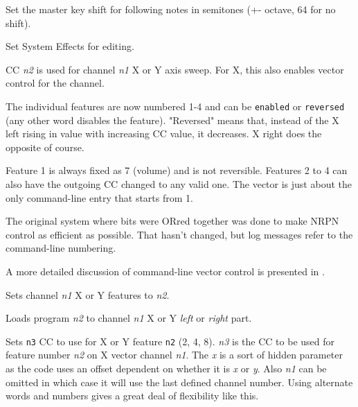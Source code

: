       Set the master key shift for following notes in semitones (+-
      octave, 64 for no shift).

      Set System Effects for editing.

      CC \textsl{n2} is used for channel \textsl{n1} X or Y axis sweep.
      For X, this also enables vector control for the channel.

      The individual features are now numbered 1-4 and can be
       \texttt{enabled} or
       \texttt{reversed} (any
      other word disables the feature).
      "Reversed" means that, instead of the X left rising in
      value with increasing CC value, it decreases.
      X right does the opposite of course.

      Feature 1 is always fixed as 7 (volume) and is not reversible.
      Features 2 to 4 can also have the outgoing CC changed to any valid one.
      The vector is just about the only command-line
      entry that starts from 1.

      The original system where bits were ORred together was done to make NRPN
      control as efficient as possible. That hasn't changed, but log messages
      refer to the command-line numbering.

      A more detailed discussion of command-line vector control is presented in
      .

      Sets channel \textsl{n1} X or Y features to \textsl{n2}.

      Loads program \textsl{n2} to channel \textsl{n1} X or Y
      \textsl{left} or \textsl{right} part.

      Sets \texttt{n3} CC to use for X or Y feature \texttt{n2} (2, 4, 8).
      \textsl{n3} is the CC to be used for feature number \textsl{n2} on X
      vector channel \textsl{n1}. The \textsl{x} is a sort of hidden parameter
      as the code uses an offset dependent on whether it is \textsl{x} or
      \textsl{y}. Also \textsl{n1} can be omitted in which case it will use the
      last defined channel number. Using alternate words and numbers gives a
      great deal of flexibility like this.

